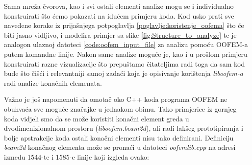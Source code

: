 \documentclass[a4paper,twoside,12pt]{memoir} %
\begin{document}
Sama mreža čvorova, kao i svi ostali elementi analize mogu se i individualno konstruirati što ćemo pokazati na idućem primjeru koda. Kod usko prati sve navedene korake iz prijašnjega potpoglavlja \ref{poglavlje:koristenje_oofema} što će biti jasno vidljivo, i modelira primjer sa slike \ref{fig:Structure_to_analyze} te je analogon ulaznoj datoteci \ref{code:oofem_input_file} za analizu pomoću OOFEM-a putem komandne linije. Nakon same analize moguće je, kao i u prošlom primjeru konstruirati razne vizualizacije što prepuštamo čitateljima radi toga da sam kod bude što čišći i relevantniji samoj zadaći koja je opisivanje korištenja \textit{liboofem-a} radi analize konačnih elemenata.



Važno je još napomenuti da omotač oko C++ koda programa OOFEM ne obuhvaća sve moguće značajke u jednakom obimu. Tako primjerice iz gornjeg koda vidjeli smo da se može koristiti konačni element greda u dvodimenizionalnom prostoru (\textit{liboofem.beam2d}), ali radi lakšeg prototipiranja i bolje apstrakcije koda ostali konačni elementi nisu tako definirani. Definiciju \textit{beam2d} konačnog elementa može se pronaći u datoteci \textit{oofemlib.cpp} na adresi \cite{oofemlib_source} između 1544-te i 1585-e linije koji izgleda ovako:
\end{document}
